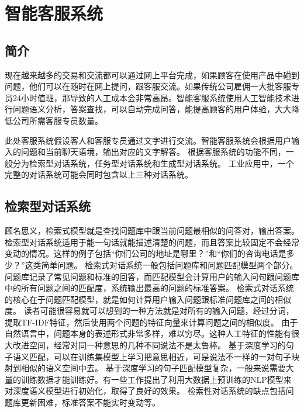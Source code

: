 %
%
%
\chapter{智能客服系统}
\label{basic} %


\section{简介}
现在越来越多的交易和交流都可以通过网上平台完成，如果顾客在使用产品中碰到问题，他们可以在随时在网上提问，跟客服交流。如果传统公司雇佣一大批客服专员24小时值班，那导致的人工成本会非常高昂。智能客服系统使用人工智能技术进行问题语义分析，答案查找，可以自动完成问答，能提高顾客的用户体验，大大降低公司所需客服专员数量。

此处客服系统假设客人和客服专员通过文字进行交流。智能客服系统会根据用户输入的问题和当前聊天语境，输出对应的文字解答。
根据客服系统的功能不同，一般分为检索型对话系统，任务型对话系统\cite{young2013pomdp}和生成型对话系统\cite{sutskever2014sequence,shang2015neural,serban2016building,serban2016hierarchical}。
工业应用中，一个完整的对话系统可能会同时包含以上三种对话系统。

\section{检索型对话系统}
顾名思义，检索式模型就是查找问题库中跟当前问题最相似的问答对，输出答案。
检索型对话系统适用于能一句话就能描述清楚的问题，而且答案比较固定不会经常变动的情况。这样的例子包括``你们公司的地址是哪里？''和``你们的咨询电话是多少？''这类简单问题。
检索式对话系统一般包括问题库和问题匹配模型两个部分。问题库记录了常见问题和标准的回答，而匹配模型会计算用户的输入问句跟问题库中的所有问题之间的匹配度，系统输出最高的问题的标准答案。
检索式对话系统的核心在于问题匹配模型，就是如何计算用户输入问题跟标准问题库之间的相似度。
读者可能很容易就可以想到的一种方法就是对所有的输入问题，经过分词，提取TF-IDF特征，然后使用两个问题的特征向量来计算问题之间的相似度。
由于自然语言中，问题本身的表述形式非常多样，难以穷尽。这种人工特征的性能有很大改进空间，经常对同一种意思的几种不同说法不是太鲁棒。
基于深度学习的句子语义匹配，可以在训练集模型上学习把意思相近，可是说法不一样的一对句子映射到相似的语义空间中去。
基于深度学习的句子匹配模型复杂，一般来说需要大量的训练数据才能训练好。有一些工作提出了利用大数据上预训练的NLP模型来对深度语义模型进行初始化，取得了良好的效果。
检索性对话系统的缺点包括问题库更新困难，标准答案不能实时变动等。


